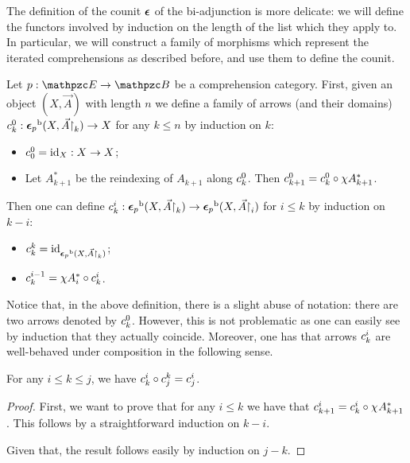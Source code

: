 \documentclass{lmcs} %
\theoremstyle{plain}\newtheorem{satz}[thm]{Satz} %
\begin{document}
The definition of the counit 
$\boldsymbol{\epsilon}$ of the bi-adjunction is more delicate: 
we will define the functors involved by induction on the length of the list which they apply to. 
In particular, we will construct a family of morphisms which represent the iterated comprehensions as described before, and use them to define the counit.

			\begin{defi}\label{def:comp-maps}
				Let $p:\ct{E}\rightarrow \ct{B}$ be a comprehension category. 
				First, given an object $(X,\vec{A})$ with length $n$ we define a family of arrows (and their domains) $c^{0}_{k}:{\boldsymbol{\epsilon}_p}^{\mathrm{b}}(X,\vec{A}\mathord{\restriction}_k)\rightarrow X$ for any $k\leq n$ by induction on $k$:
				\begin{itemize}[align=left]
					\item[\emph{k=0:}] $c^{0}_{0}=\mathrm{id}_{X}:X\rightarrow X$;
					\item[\emph{k+1:}] Let $A_{k+1}^*$ be the reindexing of $A_{k+1}$ along $c^{0}_{k}$. Then $c^{0}_{k+1}=c^{0}_{k}\circ\chi A_{k+1}^*$.
				\end{itemize}	
				Then one can define $c^{i}_{k}:{\boldsymbol{\epsilon}_p}^{\mathrm{b}}(X,\vec{A}\mathord{\restriction}_k)\rightarrow {\boldsymbol{\epsilon}_p}^{\mathrm{b}}(X,\vec{A}\mathord{\restriction}_i)$ for $i\leq k$ by induction on $k-i$:
				\begin{itemize}[align=left]
					\item[\emph{k-i=0:}] $c^{k}_{k}=\mathrm{id}_{{\boldsymbol{\epsilon}_p}^{\mathrm{b}}(X,\vec{A}\mathord{\restriction}_k)}$;
					\item[\emph{k-i+1:}] $c^{i-1}_{k}= \chi A_{i}^*\circ c^{i}_{k}$.
				\end{itemize}
			\end{defi}
			
Notice that, in the above definition, there is a slight abuse of notation: 
there are two arrows denoted by $c^{0}_{k}$. 
However, this is not problematic as 
one can easily see by induction that they actually coincide.
% 
Moreover, one has that arrows $c^{i}_{k}$ are well-behaved under composition in the following sense.
			
			\begin{lem}\label{lem:C-coherence}
				For any $i\leq k\leq j$, we have $c^{i}_{k}\circ c^{k}_{j} = c^{i}_{j}$. 
			\end{lem}
			
			\begin{proof}
				First, we want to prove that for any $i\leq k$ we have that $c^{i}_{k+1}=c^{i}_{k}\circ \chi^{}A_{k+1}^*$. This follows by a straightforward induction on $k-i$.
				
				Given that, the result follows easily by induction on $j-k$.

			\end{proof}
			
\end{document}
